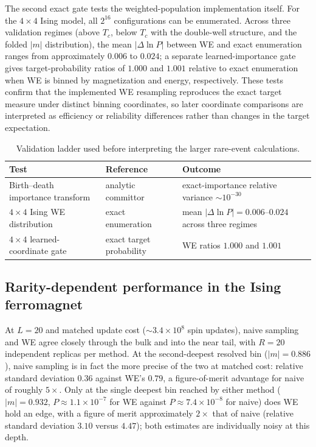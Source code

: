 \documentclass[a4paper,fleqn]{cas-sc}
\begin{document}
The second exact gate tests the weighted-population implementation itself.\label{sec:gate}
For the $4\times4$ Ising model, all $2^{16}$ configurations can be enumerated. Across three
validation regimes (above $T_c$, below $T_c$ with the double-well structure, and the folded
$|m|$ distribution), the mean $|\Delta\ln P|$ between WE and exact enumeration ranges from
approximately $0.006$ to $0.024$; a separate learned-importance gate gives target-probability
ratios of $1.000$ and $1.001$ relative to exact enumeration when WE is binned by magnetization
and energy, respectively. These tests confirm that the implemented WE resampling reproduces the exact target measure
under distinct binning coordinates, so later coordinate comparisons are interpreted as
efficiency or reliability differences rather than changes in the target expectation.

\begin{table}[H]
\centering\small
\caption{Validation ladder used before interpreting the larger rare-event calculations.}
\label{tab:ladder}
\begin{tabular}{p{}p{}p{}}
\toprule
Test & Reference & Outcome \\
\midrule
Birth--death importance transform & analytic committor & exact-importance relative variance
$\sim10^{-30}$ \\
$4\times4$ Ising WE distribution & exact enumeration & mean $|\Delta\ln P|=0.006$--$0.024$
across three regimes \\
$4\times4$ learned-coordinate gate & exact target probability & WE ratios $1.000$ and
$1.001$ \\
\bottomrule
\end{tabular}
\end{table}

\FloatBarrier

\subsection{Rarity-dependent performance in the Ising ferromagnet}\label{sec:tail}\label{sec:tailreach}
At $L=20$ and matched update cost ($\sim3.4\times10^{8}$ spin updates), naive sampling and WE
agree closely through the bulk and into the near tail, with $R=20$ independent replicas per
method. At the second-deepest resolved bin ($|m|=0.886$), naive sampling is in fact the more
precise of the two at matched cost: relative standard deviation $0.36$ against WE's $0.79$, a
figure-of-merit advantage for naive of roughly $5\times$. Only at the single deepest bin
reached by either method ($|m|=0.932$, $P\approx1.1\times10^{-7}$ for WE against
$P\approx7.4\times10^{-8}$ for naive) does WE hold an edge, with a figure of merit approximately
$2\times$ that of naive (relative standard deviation $3.10$ versus $4.47$); both estimates are
individually noisy at this depth.
\end{document}
